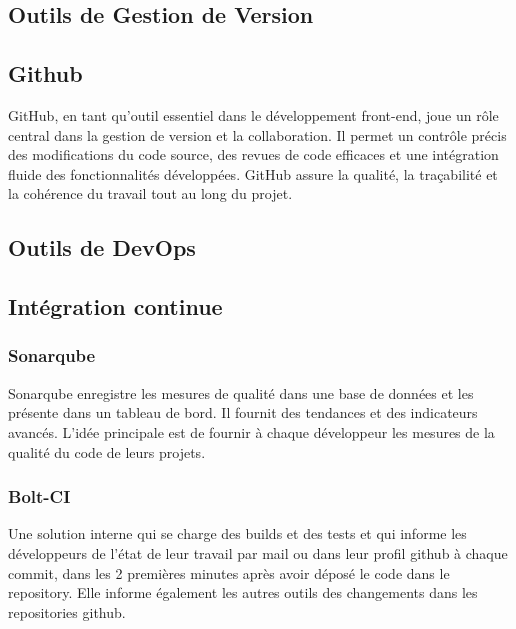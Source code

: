\subsection{Outils de Gestion de Version}
\subsection*{Github}
GitHub, en tant qu’outil essentiel dans le développement front-end, joue un rôle central dans la
gestion de version et la collaboration. Il permet un contrôle précis des modifications du code source,
des revues de code efficaces et une intégration fluide des fonctionnalités développées. GitHub assure
la qualité, la traçabilité et la cohérence du travail tout au long du projet.

\subsection{Outils de DevOps}
\subsection*{Intégration continue}
\subsubsection*{Sonarqube}
Sonarqube enregistre les mesures de qualité dans une base de données et les présente dans un tableau de
bord. Il fournit des tendances et des indicateurs avancés. L’idée principale est de fournir à
chaque développeur les mesures de la qualité du code de leurs projets.

\subsubsection*{Bolt-CI}
Une solution interne qui se charge des builds et des tests et qui informe les développeurs de
l’état de leur travail par mail ou dans leur profil github à chaque commit, dans les 2 premières
minutes après avoir déposé le code dans le repository. Elle informe également les autres outils
des changements dans les repositories github.\\

